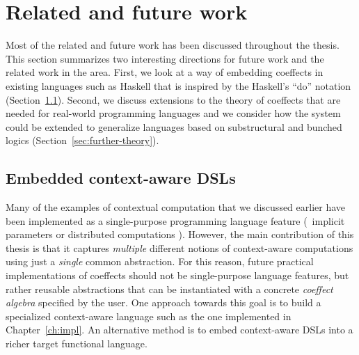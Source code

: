 %
%

\section{Related and future work}
\label{sec:further-further}

Most of the related and future work has been discussed throughout the thesis. This section summarizes
two interesting directions for future work and the related work in the area. First, we look at a way of
embedding coeffects in existing languages such as Haskell that is inspired by the Haskell's ``do'' notation
(Section~\ref{sec:further-impl}). Second, we discuss extensions to the theory of coeffects that
are needed for real-world programming languages and we consider how the system could be extended
to generalize languages based on substructural and bunched logics (Section~\ref{sec:further-theory}).

\subsection{Embedded context-aware DSLs}
\label{sec:further-impl}

Many of the examples of contextual computation that we discussed earlier have been implemented as
a single-purpose programming language feature (\eg~implicit parameters \cite{app-implicit-parameters}
or distributed computations \cite{app-distributed-ml5,app-distributed-links}). However,
the main contribution of this thesis is that it captures
\emph{multiple} different notions of context-aware computations using just a \emph{single}
common abstraction. For this reason, future practical implementations of coeffects should not be
single-purpose language features, but rather reusable abstractions that
can be instantiated with a concrete \emph{coeffect algebra} specified by the user.
One approach towards this goal is to build a specialized context-aware language such as the
one implemented in Chapter~\ref{ch:impl}. An alternative method is to embed context-aware
DSLs into a richer target functional language.

